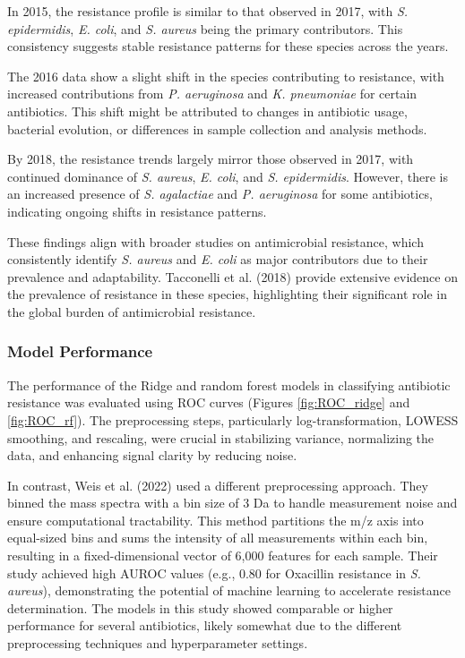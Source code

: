 \documentclass[english,11pt,a4paper,titlepage]{article}
\begin{document}
In 2015, the resistance profile is similar to that observed in 2017, with \textit{S. epidermidis}, \textit{E. coli}, and \textit{S. aureus} being the primary contributors. This consistency suggests stable resistance patterns for these species across the years.

The 2016 data show a slight shift in the species contributing to resistance, with increased contributions from \textit{P. aeruginosa} and \textit{K. pneumoniae} for certain antibiotics. This shift might be attributed to changes in antibiotic usage, bacterial evolution, or differences in sample collection and analysis methods.

By 2018, the resistance trends largely mirror those observed in 2017, with continued dominance of \textit{S. aureus}, \textit{E. coli}, and \textit{S. epidermidis}. However, there is an increased presence of \textit{S. agalactiae} and \textit{P. aeruginosa} for some antibiotics, indicating ongoing shifts in resistance patterns.

These findings align with broader studies on antimicrobial resistance, which consistently identify \textit{S. aureus} and \textit{E. coli} as major contributors due to their prevalence and adaptability. Tacconelli et al. (2018) \cite{tacconelliDiscoveryResearchDevelopment2018} provide extensive evidence on the prevalence of resistance in these species, highlighting their significant role in the global burden of antimicrobial resistance.

\subsubsection*{Model Performance}
The performance of the Ridge and random forest models in classifying antibiotic resistance was evaluated using ROC curves (Figures \ref{fig:ROC_ridge} and \ref{fig:ROC_rf}). The preprocessing steps, particularly log-transformation, LOWESS smoothing, and rescaling, were crucial in stabilizing variance, normalizing the data, and enhancing signal clarity by reducing noise.

In contrast, Weis et al. (2022) \cite{weisDirectAntimicrobialResistance2022} used a different preprocessing approach. They binned the mass spectra with a bin size of 3 Da to handle measurement noise and ensure computational tractability. This method partitions the m/z axis into equal-sized bins and sums the intensity of all measurements within each bin, resulting in a fixed-dimensional vector of 6,000 features for each sample. Their study achieved high AUROC values (e.g., 0.80 for Oxacillin resistance in \textit{S. aureus}), demonstrating the potential of machine learning to accelerate resistance determination. The models in this study showed comparable or higher performance for several antibiotics, likely somewhat due to the different preprocessing techniques and hyperparameter settings.
\end{document}
